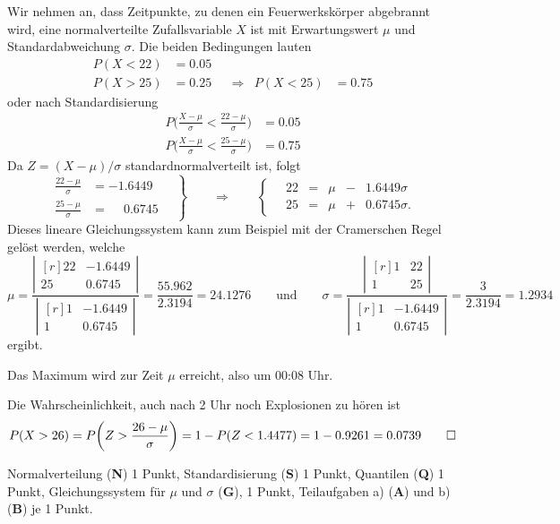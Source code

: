 \begin{loesung}
Wir nehmen an, dass Zeitpunkte, zu denen ein Feuerwerkskörper 
abgebrannt wird, eine normalverteilte Zufallsvariable $X$
ist mit Erwartungswert $\mu$ und Standardabweichung $\sigma$.
Die beiden Bedingungen lauten
\[
\begin{aligned}
P(X < 22) &= 0.05 &&           &         &       \\
P(X > 25) &= 0.25 &&\Rightarrow& P(X<25) &= 0.75
\end{aligned}
\]
oder nach Standardisierung
\begin{align*}
P\biggl( \frac{X-\mu}{\sigma} < \frac{22-\mu}{\sigma} \biggr) &= 0.05 \\
P\biggl( \frac{X-\mu}{\sigma} < \frac{25-\mu}{\sigma} \biggr) &= 0.75
\end{align*}
Da $Z=(X-\mu)/\sigma$ standardnormalverteilt ist, folgt
\[
\left.
\begin{aligned}
\frac{22-\mu}{\sigma} &=          - 1.6449 \\
\frac{25-\mu}{\sigma} &= \phantom{-}0.6745
\end{aligned}
\quad
\right\}
\qquad\Rightarrow\qquad
\left\{
\quad
\begin{array}{rcrcr}
22 &=& \mu &-& 1.6449\sigma\phantom{.}\\
25 &=& \mu &+& 0.6745\sigma.
\end{array}
\right.
\]
Dieses lineare Gleichungssystem kann zum Beispiel mit der Cramerschen
Regel gelöst werden, welche
\[
\mu
=
\frac{
\left|\begin{matrix*}[r]22&-1.6449\\25&0.6745\end{matrix*}\right|
}{
\left|\begin{matrix*}[r]1&-1.6449\\1&0.6745\end{matrix*}\right|
}
=
\frac{55.962}{2.3194}
=
24.1276
\qquad\text{und}\qquad
\sigma
=
\frac{
\left|\begin{matrix*}[r]1&22\\1&25\end{matrix*}\right|
}{
\left|\begin{matrix*}[r]1&-1.6449\\1&0.6745\end{matrix*}\right|
}
=
\frac{3}{2.3194}
=
1.2934
\]
ergibt.
\begin{teilaufgaben}
\item
Das Maximum wird zur Zeit $\mu$ erreicht, also um 00:08 Uhr.
\item
Die Wahrscheinlichkeit, auch nach 2 Uhr noch Explosionen zu hören ist
\[
P(X>26) = P\biggl(Z> \frac{26-\mu}{\sigma}\biggr)
=
1-
P(Z <  1.4477) = 1 - 0.9261 = 0.0739
\qedhere
\]
\end{teilaufgaben}
\end{loesung}

\begin{bewertung}
Normalverteilung ({\bf N}) 1 Punkt,
Standardisierung ({\bf S}) 1 Punkt,
Quantilen ({\bf Q}) 1 Punkt,
Gleichungssystem für $\mu$ und $\sigma$ ({\bf G}), 1 Punkt,
Teilaufgaben a) ({\bf A}) und b) ({\bf B}) je 1 Punkt.

\end{bewertung}
